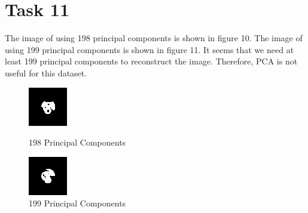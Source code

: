 \documentclass[11pt]{article}
\theoremstyle{plain}
\theoremstyle{definition}
\begin{document}
\section{Task 11}
The image of using 198 principal components is shown in figure 10. The image of using 199 principal components is shown in figure 11. It seems that we need at least 199 principal components to reconstruct the image. Therefore, PCA is not useful for this dataset. 

\begin{figure}[!htb]
   \begin{minipage}{0.48\textwidth}
     \centering
     \includegraphics[width=.7\linewidth]{Task11_1.png}
     \caption{198 Principal Components}\label{Fig:198 PC}
   \end{minipage}\hfill
   \begin {minipage}{0.48\textwidth}
     \centering
     \includegraphics[width=.7\linewidth]{Task11.png}
     \caption{199 Principal Components}\label{Fig:199 PC}
   \end{minipage}\hfill 
\end{figure} 
\end{document}
